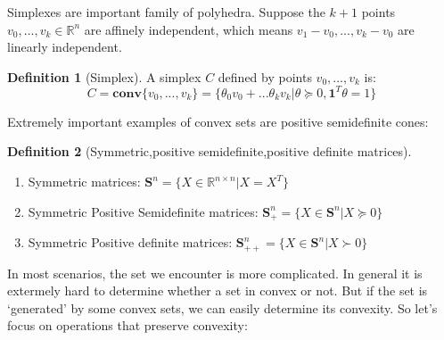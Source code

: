 \documentclass[
]{book}
\providecommand{\tightlist}{%
  \setlength{\itemsep}{0pt}\setlength{\parskip}{0pt}}
\theoremstyle{definition}
\newtheorem{definition}{Definition}[chapter]
\theoremstyle{definition}
\theoremstyle{definition}
\theoremstyle{definition}
\theoremstyle{remark}
\begin{document}
Simplexes are important family of polyhedra. Suppose the \(k+1\) points \(v_0,...,v_k\in \mathbb{R}^n\) are affinely independent, which means \(v_1-v_0,...,v_k-v_0\) are linearly independent.

\begin{definition}[Simplex]
\protect\hypertarget{def:simplex}{}\label{def:simplex}A simplex \(C\) defined by points \(v_0,...,v_k\) is: \[C = \textbf{conv}\{v_0,...,v_k\} = \{\theta_0v_0 + ... \theta_kv_k|\theta \succeq 0, \textbf{1}^T\theta = 1\}\]
\end{definition}

Extremely important examples of convex sets are positive semidefinite cones:

\begin{definition}[Symmetric,positive semidefinite,positive definite matrices]
\protect\hypertarget{def:symmetricmatrices}{}\label{def:symmetricmatrices}\leavevmode

\begin{enumerate}
\def\labelenumi{\arabic{enumi}.}
\tightlist
\item
  Symmetric matrices: \(\textbf{S}^n = \{X\in\mathbb{R}^{n\times n}| X=X^T\}\)
\item
  Symmetric Positive Semidefinite matrices: \(\textbf{S}_+^n = \{X\in\textbf{S}^n| X\succeq0\}\)
\item
  Symmetric Positive definite matrices: \(\textbf{S}_{++}^n = \{X\in\textbf{S}^n| X\succ0\}\)
\end{enumerate}

\end{definition}

In most scenarios, the set we encounter is more complicated. In general it is extermely hard to determine whether a set in convex or not. But if the set is `generated' by some convex sets, we can easily determine its convexity. So let's focus on operations that preserve convexity:
\end{document}
